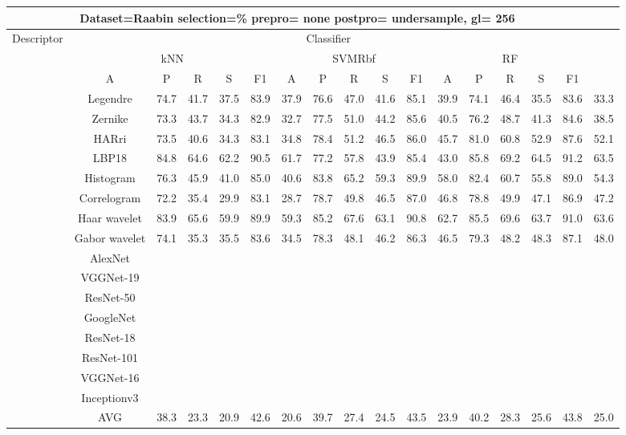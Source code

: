 \documentclass[12pt,italian]{article}
\begin{document}
\begin{tiny}
\begin{longtable}{lcccccccccccccccc}
\toprule
\multicolumn{16}{c}{Dataset=Raabin selection=\% prepro= none postpro= undersample, gl= 256} \\ 
\toprule
Descriptor & \multicolumn{15}{c}{Classifier} \\ 
& \multicolumn{5}{c}{kNN} & \multicolumn{5}{c}{SVMRbf} & \multicolumn{5}{c}{RF} \\ 
& A & P & R & S & F1 & A & P & R & S & F1 & A & P & R & S & F1 \\ 
\midrule
& Legendre & 74.7 & 41.7 & 37.5 & 83.9 & 37.9 & 76.6 & 47.0 & 41.6 & 85.1 & 39.9 & 74.1 & 46.4 & 35.5 & 83.6 & 33.3 \\ 
& Zernike & 73.3 & 43.7 & 34.3 & 82.9 & 32.7 & 77.5 & 51.0 & 44.2 & 85.6 & 40.5 & 76.2 & 48.7 & 41.3 & 84.6 & 38.5 \\ 
& HARri & 73.5 & 40.6 & 34.3 & 83.1 & 34.8 & 78.4 & 51.2 & 46.5 & 86.0 & 45.7 & 81.0 & 60.8 & 52.9 & 87.6 & 52.1 \\ 
& LBP18 & 84.8 & 64.6 & 62.2 & 90.5 & 61.7 & 77.2 & 57.8 & 43.9 & 85.4 & 43.0 & 85.8 & 69.2 & 64.5 & 91.2 & 63.5 \\ 
& Histogram & 76.3 & 45.9 & 41.0 & 85.0 & 40.6 & 83.8 & 65.2 & 59.3 & 89.9 & 58.0 & 82.4 & 60.7 & 55.8 & 89.0 & 54.3 \\ 
& Correlogram & 72.2 & 35.4 & 29.9 & 83.1 & 28.7 & 78.7 & 49.8 & 46.5 & 87.0 & 46.8 & 78.8 & 49.9 & 47.1 & 86.9 & 47.2 \\ 
& Haar wavelet & 83.9 & 65.6 & 59.9 & 89.9 & 59.3 & 85.2 & 67.6 & 63.1 & 90.8 & 62.7 & 85.5 & 69.6 & 63.7 & 91.0 & 63.6 \\ 
& Gabor wavelet & 74.1 & 35.3 & 35.5 & 83.6 & 34.5 & 78.3 & 48.1 & 46.2 & 86.3 & 46.5 & 79.3 & 48.2 & 48.3 & 87.1 & 48.0 \\ 
& AlexNet \\ 
& VGGNet-19 \\ 
& ResNet-50 \\ 
& GoogleNet \\ 
& ResNet-18 \\ 
& ResNet-101 \\ 
& VGGNet-16 \\ 
& Inceptionv3 \\ 
\hline
& AVG & 38.3 & 23.3 & 20.9 & 42.6 & 20.6 & 39.7 & 27.4 & 24.5 & 43.5 & 23.9 & 40.2 & 28.3 & 25.6 & 43.8 & 25.0 \\ 
\hline
\bottomrule
\end{longtable} 


\end{tiny}
\end{document}
